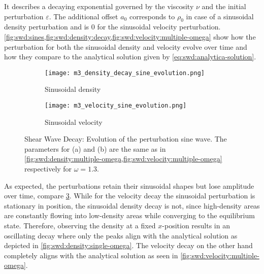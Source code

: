 It describes a decaying exponential governed by the viscosity $\nu$ and the initial perturbation $\varepsilon$. The additional offset $a_0$ corresponds to $\rho_0$ in case of a sinusoidal density perturbation and is $0$ for the sinusoidal velocity perturbation. \cref{fig:swd:sines,fig:swd:density:decay,fig:swd:velocity:multiple-omega} show how the perturbation for both the sinusoidal density and velocity evolve over time and how they compare to the analytical solution given by \cref{eq:swd:analytica-solution}.

\begin{figure}[ht!]
    \begin{subfigure}{0.514\linewidth}
        \centering
        \texttt{[image: m3\_density\_decay\_sine\_evolution.png]}
        \caption{Sinusoidal density}
        \label{fig:swd:density:sine}
    \end{subfigure}%
    \begin{subfigure}{0.486\linewidth}
        \centering
        \texttt{[image: m3\_velocity\_sine\_evolution.png]}
        \caption{Sinusoidal velocity}
        \label{fig:swd:velocity:sine}
    \end{subfigure}
    \caption[Shear Wave Decay: Evolution of the perturbation sine wave]{Shear Wave Decay: Evolution of the perturbation sine wave. The parameters for (a) and (b) are the same as in \cref{fig:swd:density:multiple-omega,fig:swd:velocity:multiple-omega} respectively for $\omega=1.3$.}
    \label{fig:swd:sines}
\end{figure}

As expected, the perturbations retain their sinusoidal shapes but lose amplitude over time, compare \cref{fig:swd:sines}. While for the velocity decay the sinusoidal perturbation is stationary in position, the sinusoidal density decay is not, since high-density areas are constantly flowing into low-density areas while converging to the equilibrium state. Therefore, observing the density at a fixed $x$-position results in an oscillating decay where only the peaks align with the analytical solution as depicted in \cref{fig:swd:density:single-omega}. The velocity decay on the other hand completely aligns with the analytical solution as seen in \cref{fig:swd:velocity:multiple-omega}.

